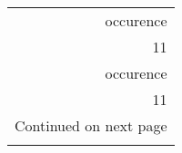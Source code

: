 \begin{longtable}{r}
\toprule
 occurence \\
        11 \\
\midrule
\endfirsthead

\toprule
 occurence \\
        11 \\
\midrule
\endhead
\midrule
\multicolumn{1}{r}{{Continued on next page}} \\
\midrule
\endfoot

\bottomrule
\endlastfoot
         6 \\
\end{longtable}
